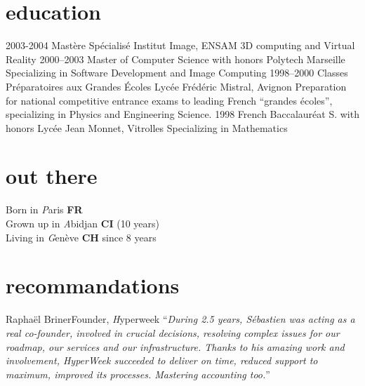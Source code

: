 \documentclass[]{friggeri}
\begin{document}
\section{education}

\begin{entrylist}
  \entry
    {2003-2004}
    {Mastère Spécialisé}
    {Institut Image, ENSAM}
    {3D computing and Virtual Reality}
  \entry
    {2000–2003}
    {Master of Computer Science with honors}
    {Polytech Marseille}
    {Specializing in Software Development and Image Computing}
  \entry
    {1998–2000}
    {Classes Préparatoires aux Grandes Écoles}
    {Lycée Frédéric Mistral, Avignon}
    {Preparation for national competitive entrance exams to leading French
    ``grandes écoles'', specializing in Physics and Engineering Science.}
  \entry
    {1998}
    {French Baccalauréat S. with honors}
    {Lycée Jean Monnet, Vitrolles}
    {Specializing in Mathematics}
\end{entrylist}

\section{out there}

{\FA \faMapMarker} Born in {\emph Paris} {\bf FR}\\
{\FA \faPlane} Grown up in {\emph Abidjan} {\bf CI} (10 years)\\
{\FA \faPlane} Living in {\emph Genève} {\bf CH} since 8 years

\clearpage

\section{recommandations}

\begin{quoting}{Raphaël Briner}{Founder, {\emph Hyperweek}}
``\textit{During 2.5 years, Sébastien was acting as a real co-founder,
involved in crucial decisions, resolving complex issues for our roadmap, our
services and our infrastructure. Thanks to his amazing work and involvement,
HyperWeek succeeded to deliver on time, reduced support to maximum, improved
its processes. Mastering accounting too.}''
\end{quoting}
\end{document}

